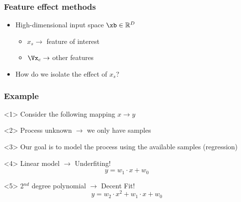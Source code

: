 \begin{frame}
  \frametitle{Feature effect methods}
  \begin{itemize}
  \item High-dimensional input space \(\xb \in \mathbb{R}^D\)
    \begin{itemize}
    \item \(x_s \rightarrow \) feature of interest
    \item \(\Vx_c \rightarrow\) other features
    \end{itemize}
  \item How do we isolate the effect of \(x_s\)?
  \end{itemize}
\end{frame}


\begin{frame}
  \frametitle{Example}
  \begin{onlyenv}<1>
    Consider the following mapping $x \rightarrow y$
    \begin{center}
      \scalebox{0.5}{
        
      }
    \end{center}
  \end{onlyenv}
  \begin{onlyenv}<2>
    Process unknown \(\rightarrow\) we only have samples
    \begin{center}
      \scalebox{0.5}{
        
      }
    \end{center}
  \end{onlyenv}
  \begin{onlyenv}<3>
    Our goal is to model the process using the available samples (regression)
    \vspace{1cm}\\
  \end{onlyenv}
  \begin{onlyenv}<4>
    Linear model \(\rightarrow\) Underfiting!
    \begin{equation*}
      y = w_1\cdot x + w_0
    \end{equation*}
    \begin{center}
      \scalebox{0.5}{
        
      }
    \end{center}
  \end{onlyenv}
  \begin{onlyenv}<5>
    2$^{nd}$ degree polynomial \(\rightarrow\) Decent Fit!
    \begin{equation*}
      y = w_2\cdot x^2 + w_1\cdot x + w_0

\end{equation*}
\end{onlyenv}
\end{frame}

